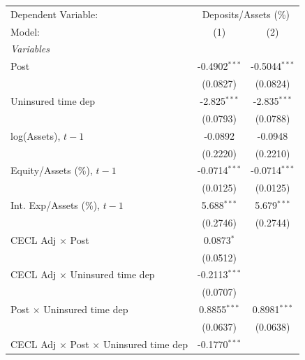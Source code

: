 
\begingroup
\centering
\begin{tabular}{lcc}
   \tabularnewline \midrule \midrule
   Dependent Variable: & \multicolumn{2}{c}{Deposits/Assets (\%)}\\
   Model:                                                & (1)             & (2)\\  
   \midrule
   \emph{Variables}\\
   Post                                                  & -0.4902$^{***}$ & -0.5044$^{***}$\\   
                                                         & (0.0827)        & (0.0824)\\   
   Uninsured time dep                                    & -2.825$^{***}$  & -2.835$^{***}$\\   
                                                         & (0.0793)        & (0.0788)\\   
   log(Assets), $t{-}1$                                  & -0.0892         & -0.0948\\   
                                                         & (0.2220)        & (0.2210)\\   
   Equity/Assets (\%), $t{-}1$                           & -0.0714$^{***}$ & -0.0714$^{***}$\\   
                                                         & (0.0125)        & (0.0125)\\   
   Int. Exp/Assets (\%), $t{-}1$                         & 5.688$^{***}$   & 5.679$^{***}$\\   
                                                         & (0.2746)        & (0.2744)\\   
   CECL Adj $\times$ Post                                & 0.0873$^{*}$    &   \\   
                                                         & (0.0512)        &   \\   
   CECL Adj $\times$ Uninsured time dep                  & -0.2113$^{***}$ &   \\   
                                                         & (0.0707)        &   \\   
   Post $\times$ Uninsured time dep                      & 0.8855$^{***}$  & 0.8981$^{***}$\\   
                                                         & (0.0637)        & (0.0638)\\   
   CECL Adj $\times$ Post $\times$ Uninsured time dep    & -0.1770$^{***}$ &   \\   

\end{tabular}
